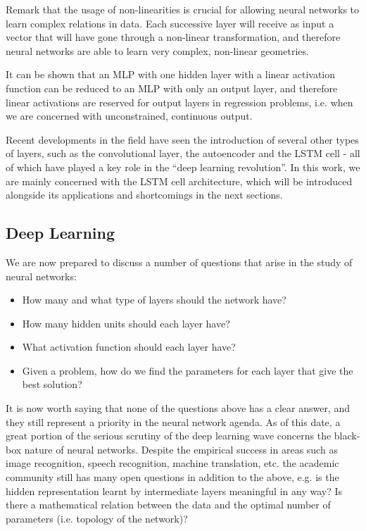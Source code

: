 \documentclass[pdftex,11pt,a4paper]{article}
\theoremstyle{definition}
\theoremstyle{remark}
\begin{document}
\par Remark that the usage of non-linearities is crucial for allowing neural networks to learn complex relations in data. Each successive layer will receive as input a vector that will have gone through a non-linear transformation, and therefore neural networks are able to learn very complex, non-linear geometries.

\par It can be shown that an MLP with one hidden layer with a linear activation function can be reduced to an MLP with only an output layer, and therefore linear activations are reserved for output layers in regression problems, i.e. when we are concerned with unconstrained, continuous output.

\par Recent developments in the field have seen the introduction of several other types of layers, such as the convolutional layer, the autoencoder and the LSTM cell - all of which have played a key role in the ``deep learning revolution''. In this work, we are mainly concerned with the LSTM cell architecture, which will be introduced alongside its applications and shortcomings in the next sections.

\subsection{Deep Learning}

\par We are now prepared to discuss a number of questions that arise in the study of neural networks:

\begin{itemize}
    \item How many and what type of layers should the network have?
    \item How many hidden units should each layer have?
    \item What activation function should each layer have?
    \item Given a problem, how do we find the parameters for each layer that give the best solution?
\end{itemize}

\par It is now worth saying that none of the questions above has a clear answer, and they still represent a priority in the neural network agenda. As of this date, a great portion of the serious scrutiny of the deep learning wave concerns the black-box nature of neural networks. Despite the empirical success in areas such as image recognition, speech recognition, machine translation, etc. the academic community still has many open questions in addition to the above, e.g. is the hidden representation learnt by intermediate layers meaningful in any way? Is there a mathematical relation between the data and the optimal number of parameters (i.e. topology of the network)? 
\end{document}
